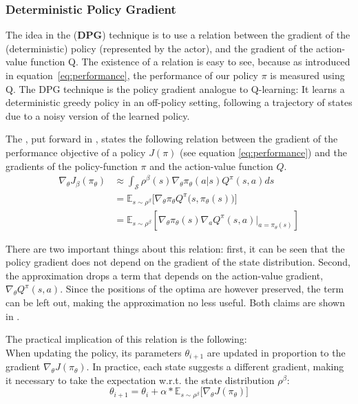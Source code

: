 \subsubsection{Deterministic Policy Gradient}

The idea in the  (\textbf{DPG}) technique is to use a relation between the gradient of the (deterministic) policy (represented by the actor), and the gradient of the action-value function Q. The existence of a relation is easy to see, because as introduced in equation~\ref{eq:performance}, the performance of our policy $\pi$ is measured using Q. The DPG technique is the policy gradient analogue to Q-learning: It learns a deterministic greedy policy in an off-policy setting, following a trajectory of states due to a noisy version of the learned policy.

The , put forward in \cite{silver_deterministic_2014}, states the following relation between the gradient of the performance objective of a policy $J(\pi)$ (see equation \ref{eq:performance}) and the gradients of the policy-function $\pi$ and the action-value function $Q$. 
\begin{align}
	\nabla_{\theta}J_\beta(\pi_\theta) &\approx \int_{\mathcal{S}} \rho^\beta(s) \nabla_\theta \pi_{\theta}(a|s)Q^\pi(s,a) ds \nonumber \\
	    &= \mathds{E}_{s\sim\rho^\beta} \Big[ \nabla_\theta \pi_\theta Q^\pi \big(s,\pi_\theta(s)\big)   \Big] \nonumber \\
		&= \mathds{E}_{s\sim\rho^\beta} \left[  \nabla_\theta \pi_{\theta}(s) \nabla_a Q^\pi(s,a) \big|_{a=\pi_\theta(s)} \right]  \label{eq:dpg}
\end{align}
\begin{flushright}
	\small There are two important things about this relation: first, it can be seen that the policy gradient does not depend on the gradient of the state distribution. Second, the approximation drops a term that depends on the action-value gradient, $\nabla_{\theta} Q^\pi(s,a)$. Since the positions of the optima are however preserved, the term can be left  out, making the approximation no less useful. Both claims are shown in \cite{silver_deterministic_2014}.\\ 
\end{flushright}

\noindent The practical implication of this relation is the following:\\
\noindent When updating the policy, its parameters $\theta_{i+1}$ are updated in proportion to the gradient $\nabla_{\theta}J(\pi_\theta)$. In practice, each state suggests a different gradient, making it necessary to take the expectation w.r.t. the state distribution $\rho^\beta$: 
\begin{equation*}
	\theta_{i+1} = \theta_i + \alpha * \mathds{E}_{s\sim\rho^\beta} \big[ \nabla_{\theta}J(\pi_\theta) \big]
\end{equation*}

